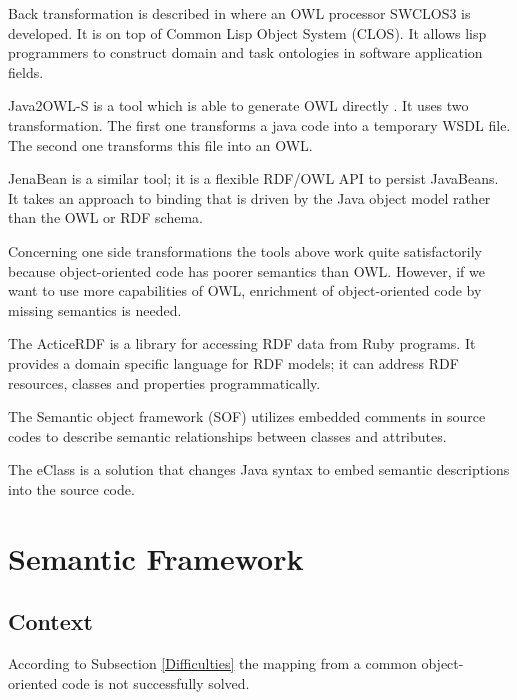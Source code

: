\documentclass[conference]{IEEEtran}
\begin{document}
Back transformation is described in \cite{owl-vs-oop} where an OWL processor SWCLOS3 is developed. It is on top of Common Lisp Object System (CLOS). It allows lisp programmers to construct domain and task ontologies in software application fields.

Java2OWL-S is a tool which is able to generate OWL directly \cite{java2owl}. It uses two transformation. The first one transforms a java code into a temporary WSDL file. The second one transforms this file into an OWL.

JenaBean \cite{JenaBean} is a similar tool; it is a flexible RDF/OWL API to persist JavaBeans. It takes an approach to binding that is driven by the Java object model rather than the OWL or RDF schema.

Concerning one side transformations the tools above work quite satisfactorily because object-oriented code has poorer semantics than OWL. However, if we want to use more capabilities of OWL, enrichment of object-oriented code by missing semantics is needed.

The ActiceRDF \cite{ActiveRDF} is a library for accessing RDF data from Ruby programs. It provides a domain specific language for RDF models; it can address
RDF resources, classes and properties programmatically.

The Semantic object framework (SOF) \cite{SOF} utilizes embedded comments in source codes to describe semantic relationships between classes and attributes.

The eClass \cite{Web-Information-Representation} is a solution that changes Java syntax to embed semantic descriptions into the source code.

\section{Semantic Framework}

\subsection{Context}

According to Subsection \ref{Difficulties} the mapping from a common object-oriented code is not successfully solved.
\end{document}
